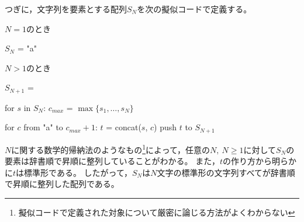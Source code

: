 \documentclass{article}
\begin{document}
\newpage

つぎに，文字列を要素とする配列$S_N$を次の擬似コードで定義する。

$N = 1$のとき
\begin{pseudo}
$S_N$ = { "a" }
\end{pseudo}

$N > 1$のとき
\begin{pseudo}
$S_{N+1}$ = {}

for $s$ in $S_N$:
    $c_{max}$ = $\max\{s_1, \dots, s_N\}$

    for $c$ from "a" to $c_{max} + 1$:
        $t$ = concat($s$, $c$)
        push $t$ to $S_{N+1}$
\end{pseudo}

$N$に関する数学的帰納法のようなもの\footnote{擬似コードで定義された対象について厳密に論じる方法がよくわからない}によって，任意の$N,\ N \geq 1$に対して$S_N$の要素は辞書順で昇順に整列していることがわかる。
また，$t$の作り方から明らかに$t$は標準形である。
したがって，$S_N$は$N$文字の標準形の文字列すべてが辞書順で昇順に整列した配列である。
\end{document}
